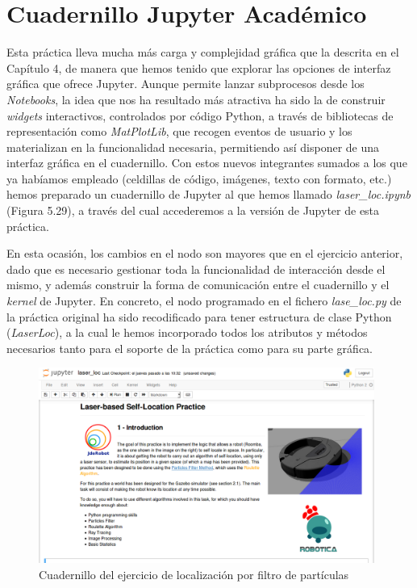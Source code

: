 \section{Cuadernillo Jupyter Académico}
Esta práctica lleva mucha más carga y complejidad gráfica que la descrita en el Capítulo 4, de manera que hemos tenido que explorar las opciones de interfaz gráfica que ofrece Jupyter. Aunque permite lanzar subprocesos desde los \textit{Notebooks}, la idea que nos ha resultado más atractiva ha sido la de construir \textit{widgets} interactivos, controlados por código Python, a través de bibliotecas de representación como \textit{MatPlotLib}, que recogen eventos de usuario y los materializan en la funcionalidad necesaria, permitiendo así disponer de una interfaz gráfica en el cuadernillo. Con estos nuevos integrantes sumados a los que ya habíamos empleado (celdillas de código, imágenes, texto con formato, etc.) hemos preparado un cuadernillo de Jupyter al que hemos llamado \textit{laser\_loc.ipynb} (Figura 5.29), a través del cual accederemos a la versión de Jupyter de esta práctica. 

En esta ocasión, los cambios en el nodo son mayores que en el ejercicio anterior, dado que es necesario gestionar toda la funcionalidad de interacción desde el mismo, y además construir la forma de comunicación entre el cuadernillo y el \textit{kernel} de Jupyter. En concreto, el nodo programado en el fichero \textit{lase\_loc.py} de la práctica original ha sido recodificado para tener estructura de clase Python (\textit{LaserLoc}), a la cual le hemos incorporado todos los atributos y métodos necesarios tanto para el soporte de la práctica como para su parte gráfica. 

\begin{figure}[H]
	\begin{center}
		\includegraphics[width=0.98\textwidth]{figures/laserlocjupyter.png}
		\caption{Cuadernillo del ejercicio de localización por filtro de partículas}
		\label{fig.laserlocjupyter}
		\end{center}
\end{figure}

